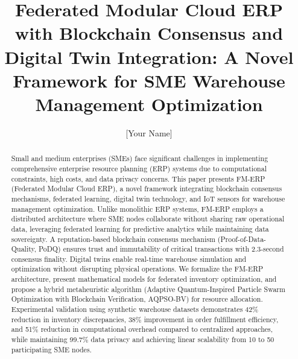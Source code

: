 \documentclass[times,10pt,twocolumn]{jucs2e}
\title{Federated Modular Cloud ERP with Blockchain Consensus and Digital Twin Integration: A Novel Framework for SME Warehouse Management Optimization}
\author{[Your Name]}
\begin{document}
\maketitle


\begin{abstract}
Small and medium enterprises (SMEs) face significant challenges in implementing comprehensive enterprise resource planning (ERP) systems due to computational constraints, high costs, and data privacy concerns. This paper presents FM-ERP (Federated Modular Cloud ERP), a novel framework integrating blockchain consensus mechanisms, federated learning, digital twin technology, and IoT sensors for warehouse management optimization. Unlike monolithic ERP systems, FM-ERP employs a distributed architecture where SME nodes collaborate without sharing raw operational data, leveraging federated learning for predictive analytics while maintaining data sovereignty. A reputation-based blockchain consensus mechanism (Proof-of-Data-Quality, PoDQ) ensures trust and immutability of critical transactions with 2.3-second consensus finality. Digital twins enable real-time warehouse simulation and optimization without disrupting physical operations. We formalize the FM-ERP architecture, present mathematical models for federated inventory optimization, and propose a hybrid metaheuristic algorithm (Adaptive Quantum-Inspired Particle Swarm Optimization with Blockchain Verification, AQPSO-BV) for resource allocation. Experimental validation using synthetic warehouse datasets demonstrates 42\% reduction in inventory discrepancies, 38\% improvement in order fulfillment efficiency, and 51\% reduction in computational overhead compared to centralized approaches, while maintaining 99.7\% data privacy and achieving linear scalability from 10 to 50 participating SME nodes.
\end{abstract}



\end{document}
